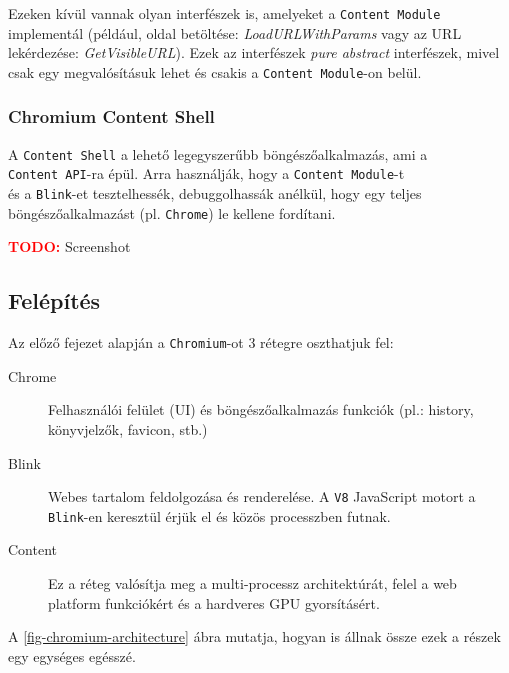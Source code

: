 \documentclass[12pt]{report}
\begin{document}
Ezeken kívül vannak olyan interfészek is, amelyeket a \texttt{Content Module} implementál
(például, oldal betöltése: \textit{LoadURLWithParams} vagy az URL lekérdezése:
\textit{GetVisibleURL}).
Ezek az interfészek \textit{pure abstract} interfészek, mivel csak egy megvalósításuk lehet
és csakis a \texttt{Content Module}-on belül. \cite{bib-chromium-content-api}

\subsubsection{Chromium Content Shell}
A \texttt{Content Shell} a lehető legegyszerűbb böngészőalkalmazás, ami a \\
\texttt{Content API}-ra épül. Arra használják, hogy a \texttt{Content Module}-t \\
és a  \texttt{Blink}-et tesztelhessék, debuggolhassák anélkül,
hogy egy teljes böngészőalkalmazást (pl. \texttt{Chrome}) le kellene fordítani.

\bigskip
\noindent
\textbf{\textcolor{red}{TODO:}} Screenshot


\subsection{Felépítés}
Az előző fejezet alapján a \texttt{Chromium}-ot 3 rétegre oszthatjuk fel:
\begin{description}
    \item[Chrome]
        Felhasználói felület (UI) és böngészőalkalmazás funkciók
        (pl.: history, könyvjelzők, favicon, stb.)
    \item[Blink]
        Webes tartalom feldolgozása és renderelése. A \texttt{V8} JavaScript motort a \\
        \texttt{Blink}-en keresztül érjük el és közös processzben futnak.
    \item[Content]
        Ez a réteg valósítja meg a multi-processz architektúrát,
        felel a web platform funkciókért és a hardveres GPU gyorsításért.
\end{description}
A \ref{fig-chromium-architecture} ábra mutatja, hogyan is állnak össze ezek a részek egy
egységes egésszé.

\pagebreak
\end{document}
